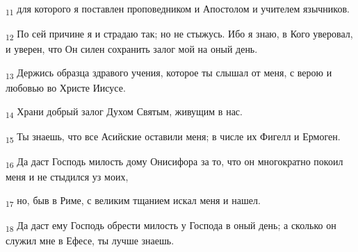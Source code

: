 \begin{tcolorbox}
\textsubscript{11} для которого я поставлен проповедником и Апостолом и учителем язычников.
\end{tcolorbox}
\begin{tcolorbox}
\textsubscript{12} По сей причине я и страдаю так; но не стыжусь. Ибо я знаю, в Кого уверовал, и уверен, что Он силен сохранить залог мой на оный день.
\end{tcolorbox}
\begin{tcolorbox}
\textsubscript{13} Держись образца здравого учения, которое ты слышал от меня, с верою и любовью во Христе Иисусе.
\end{tcolorbox}
\begin{tcolorbox}
\textsubscript{14} Храни добрый залог Духом Святым, живущим в нас.
\end{tcolorbox}
\begin{tcolorbox}
\textsubscript{15} Ты знаешь, что все Асийские оставили меня; в числе их Фигелл и Ермоген.
\end{tcolorbox}
\begin{tcolorbox}
\textsubscript{16} Да даст Господь милость дому Онисифора за то, что он многократно покоил меня и не стыдился уз моих,
\end{tcolorbox}
\begin{tcolorbox}
\textsubscript{17} но, быв в Риме, с великим тщанием искал меня и нашел.
\end{tcolorbox}
\begin{tcolorbox}
\textsubscript{18} Да даст ему Господь обрести милость у Господа в оный день; а сколько он служил мне в Ефесе, ты лучше знаешь.
\end{tcolorbox}
